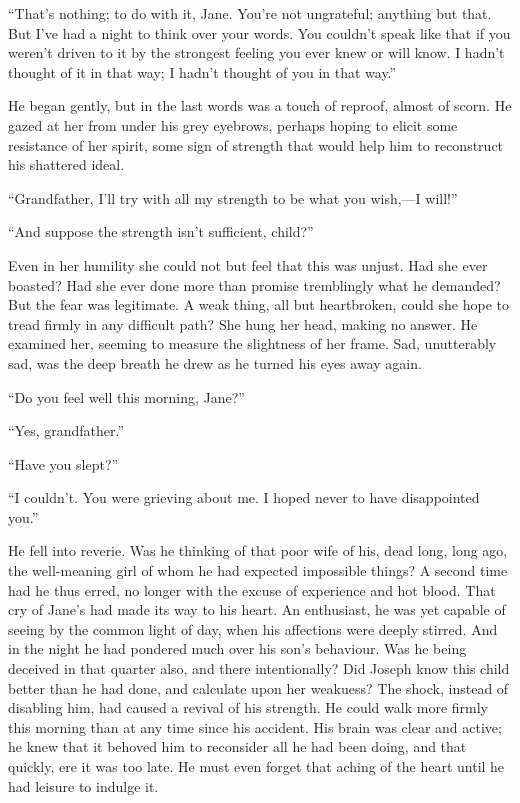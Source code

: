``That's nothing; to do with it, Jane. You're not ungrateful; anything
but that. But I've had a night to think over your words. You couldn't
speak like that if you weren't driven to it by the strongest feeling you
ever knew or will know. I hadn't thought of it in that way; I hadn't
thought of you in that way.''

He began gently, but in the last words was a touch of reproof, almost of
scorn. He gazed at her from under his grey eyebrows, perhaps hoping to
elicit some resistance of her spirit, some sign of strength that would
help him to reconstruct his shattered ideal.

{\protect\hypertarget{138}{}{}}``Grandfather, I'll try with all my
strength to be what you wish,---I will!''

``And suppose the strength isn't sufficient, child?''

Even in her humility she could not but feel that this was unjust. Had
she ever boasted? Had she ever done more than promise tremblingly what
he demanded? But the fear was legitimate. A weak thing, all but
heartbroken, could she hope to tread firmly in any difficult path? She
hung her head, making no answer. He examined her, seeming to measure the
slightness of her frame. Sad, unutterably sad, was the deep breath he
drew as he turned his eyes away again.

``Do you feel well this morning, Jane?''

``Yes, grandfather.''

``Have you slept?''

``I couldn't. You were grieving about me. I hoped never to have
disappointed you.''

He fell into reverie. Was he thinking of that poor wife of his, dead
long, long ago, the well-meaning girl of whom he had expected impossible
things? A second time had he thus erred, no longer with the excuse of
{\protect\hypertarget{139}{}{}}experience and hot blood. That cry of
Jane's had made its way to his heart. An enthusiast, he was yet capable
of seeing by the common light of day, when his affections were deeply
stirred. And in the night he had pondered much over his son's behaviour.
Was he being deceived in that quarter also, and there intentionally? Did
Joseph know this child better than he had done, and calculate upon her
weakuess? The shock, instead of disabling him, had caused a revival of
his strength. He could walk more firmly this morning than at any time
since his accident. His brain was clear and active; he knew that it
behoved him to reconsider all he had been doing, and that quickly, ere
it was too late. He must even forget that aching of the heart until he
had leisure to indulge it.

